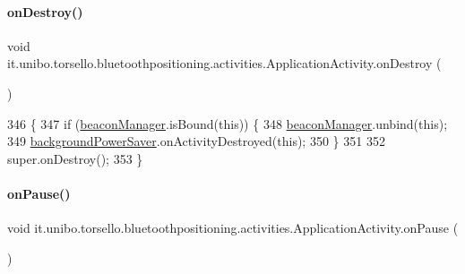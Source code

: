 \paragraph{\texorpdfstring{on\+Destroy()}{onDestroy()}}
{\footnotesize\ttfamily void it.\+unibo.\+torsello.\+bluetoothpositioning.\+activities.\+Application\+Activity.\+on\+Destroy (\begin{DoxyParamCaption}{ }\end{DoxyParamCaption})\hspace{0.3cm}{\ttfamily [protected]}}


\begin{DoxyCode}
346                                \{
347         \textcolor{keywordflow}{if} (\hyperlink{classit_1_1unibo_1_1torsello_1_1bluetoothpositioning_1_1activities_1_1ApplicationActivity_a973c37226a3dbba6016966c3555aff65_a973c37226a3dbba6016966c3555aff65}{beaconManager}.isBound(\textcolor{keyword}{this})) \{
348             \hyperlink{classit_1_1unibo_1_1torsello_1_1bluetoothpositioning_1_1activities_1_1ApplicationActivity_a973c37226a3dbba6016966c3555aff65_a973c37226a3dbba6016966c3555aff65}{beaconManager}.unbind(\textcolor{keyword}{this});
349             \hyperlink{classit_1_1unibo_1_1torsello_1_1bluetoothpositioning_1_1activities_1_1ApplicationActivity_a85885639575161f4d73d4fc788f44ace_a85885639575161f4d73d4fc788f44ace}{backgroundPowerSaver}.onActivityDestroyed(\textcolor{keyword}{this});
350         \}
351 
352         super.onDestroy();
353     \}
\end{DoxyCode}
\hypertarget{classit_1_1unibo_1_1torsello_1_1bluetoothpositioning_1_1activities_1_1ApplicationActivity_a06ed1cf654098045b1317b25067af877_a06ed1cf654098045b1317b25067af877}{}\label{classit_1_1unibo_1_1torsello_1_1bluetoothpositioning_1_1activities_1_1ApplicationActivity_a06ed1cf654098045b1317b25067af877_a06ed1cf654098045b1317b25067af877} 
\paragraph{\texorpdfstring{on\+Pause()}{onPause()}}
{\footnotesize\ttfamily void it.\+unibo.\+torsello.\+bluetoothpositioning.\+activities.\+Application\+Activity.\+on\+Pause (\begin{DoxyParamCaption}{ }\end{DoxyParamCaption})\hspace{0.3cm}{\ttfamily [protected]}}


